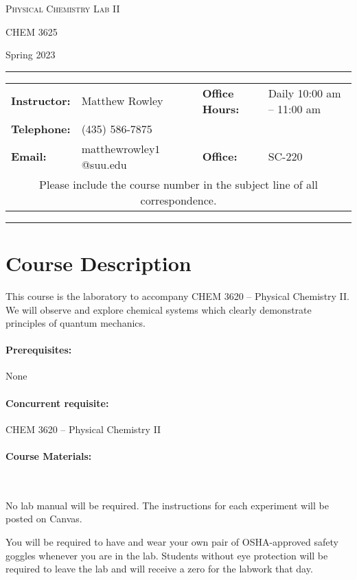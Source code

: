 \documentclass[12pt, letterpaper]{article}
\begin{document}
\begin{center}
	{\Large \textsc{Physical Chemistry Lab II}}

	CHEM 3625
\end{center}

\begin{center}
	{\large Spring 2023}
\end{center}
\begin{center}
	\rule{0.99\textwidth}{0.4pt}
	\begin{tabular}{llcll}
		\textbf{Instructor:} & Matthew Rowley           &  & \textbf{Office Hours:} & Daily 10:00 am -- 11:00 am \\
		\textbf{Telephone:}  & (435) 586-7875           &  &                        &                            \\
		\textbf{Email:}      & matthewrowley$1$@suu.edu &  & \textbf{Office:}       & SC-220                     \\
		\multicolumn{5}{c}{Please include the course number in the subject line of all correspondence.}
	\end{tabular}
	\rule{0.99\textwidth}{0.4pt}
\end{center}


\section*{Course Description}
This course is the laboratory to accompany CHEM 3620 -- Physical Chemistry II. We will observe and explore chemical systems which clearly demonstrate principles of quantum mechanics.

\paragraph{Prerequisites:}
None

\paragraph{Concurrent requisite:}
CHEM 3620 -- Physical Chemistry II

\paragraph{Course Materials:} ~

\noindent No lab manual will be required. The instructions for each experiment will be posted on Canvas.

\noindent You will be required to have and wear your own pair of OSHA-approved safety goggles whenever you are in the lab. Students without eye protection will be required to leave the lab and will receive a zero for the labwork that day.
\end{document}
